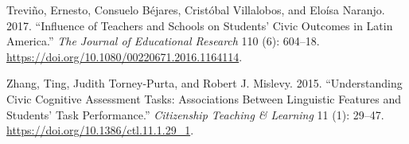 \documentclass[
]{article}
\begin{document}
\leavevmode\hypertarget{ref-trevinoInfluenceTeachersSchools2017}{}%
Treviño, Ernesto, Consuelo Béjares, Cristóbal Villalobos, and Eloísa
Naranjo. 2017. ``Influence of Teachers and Schools on Students' Civic
Outcomes in Latin America.'' \emph{The Journal of Educational Research}
110 (6): 604--18. \url{https://doi.org/10.1080/00220671.2016.1164114}.

\leavevmode\hypertarget{ref-zhangUnderstandingCivicCognitive2015}{}%
Zhang, Ting, Judith Torney-Purta, and Robert J. Mislevy. 2015.
``Understanding Civic Cognitive Assessment Tasks: Associations Between
Linguistic Features and Students' Task Performance.'' \emph{Citizenship
Teaching \& Learning} 11 (1): 29--47.
\url{https://doi.org/10.1386/ctl.11.1.29_1}.
\end{document}

